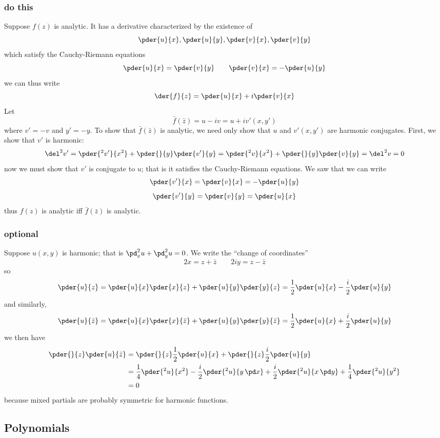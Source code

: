 \subsubsection{do this}
Suppose \(f(z)\) is analytic. It has a derivative characterized by the existence of 
\[\pder{u}{x},\pder{u}{y},\pder{v}{x},\pder{v}{y}\]
which satisfy the Cauchy-Riemann equations
\[\pder{u}{x}=\pder{v}{y}\qquad \pder{v}{x} = -\pder{u}{y}\]
we can thus write 
\[\der{f}{z} = \pder{u}{x}+i\pder{v}{x}\]
Let 
\[\bar f (\bar z) = u-iv = u+iv'(x,y')\]
where \(v'=-v\) and \(y' = -y\).
To show that \(\bar f(\bar z)\) is analytic, we need only show that \(u\) and \(v'(x,y')\) are harmonic conjugates. First, we show that \(v'\) is harmonic:
\[\del^2v'=\pder{^2v'}{x^2}+\pder{}{y}\pder{v'}{y} = \pder{^2v}{x^2}+\pder{}{y}\pder{v}{y}=\del^2v=0\]
now we must show that \(v'\) is conjugate to \(u\); that is it satisfies the Cauchy-Riemann equations. We saw that we can write
\[\pder{v'}{x}=\pder{v}{x} =-\pder{u}{y}\]
\[\pder{v'}{y}=\pder{v}{y} =\pder{u}{x}\]
thus \(f(z)\) is analytic iff \(\bar f(\bar z)\) is analytic.
\subsubsection{}
\subsubsection{optional}
Suppose \(u(x,y)\) is harmonic; that is \(\pd_x^2 u + \pd_y^2 u = 0\). We write the ``change of coordinates''
\[2x = z+\bar z\qquad 2iy = z-\bar z\]
so
\[\pder{u}{z} = \pder{u}{x}\pder{x}{z}+\pder{u}{y}\pder{y}{z} = \frac{1}{2}\pder{u}{x}-\frac{i}{2}\pder{u}{y}\]
and similarly,
\[\pder{u}{\bar z} = \pder{u}{x}\pder{x}{\bar z}+\pder{u}{y}\pder{y}{\bar z} = \frac{1}{2}\pder{u}{x}+\frac{i}{2}\pder{u}{y}\]
we then have
\begin{align*}
	\pder{}{z}\pder{u}{\bar z} &= \pder{}{z}\frac{1}{2}\pder{u}{x}+\pder{}{z}\frac{i}{2}\pder{u}{y}\\
				   &=\frac{1}{4}\pder{^2u}{x^2}-\frac{i}{2}\pder{^2u}{y\,\pd x} + \frac{i}{2}\pder{^2u}{x\,\pd y}+\frac{1}{4}\pder{^2u}{y^2}\\
				   &=0
\end{align*}
because mixed partials are probably symmetric for harmonic functions.
\subsection{Polynomials}


